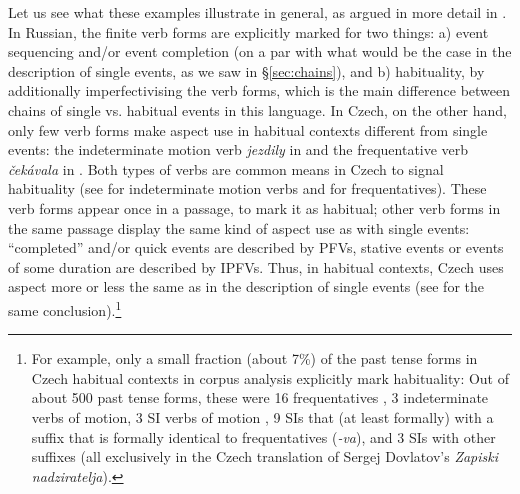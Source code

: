 \documentclass[output=paper,colorlinks,citecolor=brown]{langscibook}
\begin{document}
Let us see what these examples illustrate in general, as argued in more detail in \citet{gehrke22}. In Russian, the finite verb forms are explicitly marked for two things: a) event sequencing and/or event completion (on a par with what would be the case in the description of single events, as we saw in \S \ref{sec:chains}), and b) habituality, by additionally imperfectivising the verb forms, which is the main difference between chains of single vs. habitual events in this language. In Czech, on the other hand, only few verb forms make aspect use in habitual contexts different from single events: the indeterminate motion verb \textit{jezdily} in  %
and the frequentative verb \textit{čekávala} in . Both types of verbs are common means in Czech to signal habituality (see \citealt{eckert91} for indeterminate motion verbs and \citealt{Filip.Carlson1997} for frequentatives). These verb forms appear once in a passage, to mark it as habitual; other verb forms in the same passage display the same kind of aspect use as with single events: ``completed'' and/or quick events are described by PFVs, stative events or events of some duration are described by IPFVs. Thus, in habitual contexts, Czech uses aspect more or less the same as in the description of single %
events (see \citealt{eckert84} for the same conclusion).\footnote{For example, only a small fraction (about 7\%) of the past tense forms in Czech habitual contexts in  corpus analysis explicitly mark habituality: Out of about 500 past tense forms, these were 16 frequentatives%
, 3 indeterminate verbs of motion, 3 SI verbs of motion \citep[which sometimes also mark habituality, according to][]{eckert91}, 9 SIs that (at least formally) with a suffix that is formally identical to frequentatives (\textit{-va}), and 3 SIs with other suffixes (all exclusively in the Czech translation of Sergej Dovlatov's \textit{Zapiski nadziratelja}).%
}
\end{document}
